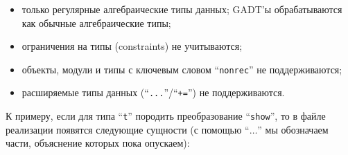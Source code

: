 \begin{itemize}
\item только регулярные алгебраические типы данных; GADT'ы обрабатываются как обычные алгебраические типы;
\item ограничения на типы (constraints) не учитываются;
\item объекты, модули и типы с ключевым словом ``\lstinline{nonrec}'' не поддерживаются;
\item расширяемые типы данных (``\lstinline{...}''/``\lstinline{+=}'') не поддерживаются.
\end{itemize}

К примеру, если для типа ``\lstinline{t}'' породить преобразование ``\lstinline{show}'', то в файле реализации появятся следующие сущности (с помощью ``$\dots$'' мы обозначаем части, объяснение которых пока опускаем):

\begin{comment}
\begin{figure}[t]
  \center
  \begin{tabular}{L{6cm}|l}
    \hline
    \multicolumn{2}{c}{С использованием \cd{camlp5}}\\
    \hline
    \lstinline|@type ... = ... | & синтаксическая конструкция для обработки  \\
    \lstinline|and  ... = ... | & типа с плагинами $p_1, p_2, \dots$; взаимно \\
    \lstinline|   $[$ with  $p_1, p_2, \dots$ $]$| & рекурсивные типы также поддерживаются; \\
    \lstinline|@$typ$| & название виртуального класса для типа $typ$; \\
    \lstinline|@$plugin$[$typ$]| & имя класса плагина для типа $typ$ и \\
                                 & плагина $plugin$\\
    \hline
        \multicolumn{2}{c}{С использованием \cd{ppxlib}}\\
    \hline
    \lstinline|type ... = ...|  & синтаксическая конструкция для \\
    \lstinline|and  ... = ...|  & обработки типа  с плагинами $p_1, p_2, \dots$  \\
    \lstinline|[@@deriving gt | & $ $ \\
    \lstinline|  ~options:{ $p_1, p_2, \dots$}]| & \\
  \end{tabular}
  \caption{Конструкции расширенного синтаксиса}
  \label{syntax}
\end{figure}
\end{comment}

